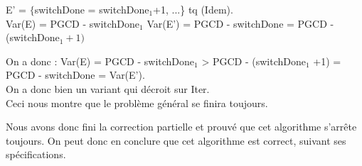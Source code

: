 E' = $\{$switchDone = switchDone$_{1}$+1, ...\} tq (Idem).\\

Var(E) = PGCD - switchDone$_{1}$
Var(E') = PGCD - switchDone = PGCD - (switchDone$_{1}+1)$

On a donc : Var(E) = PGCD - switchDone$_{1}$ > PGCD - (switchDone$_1$ +1) = PGCD - switchDone = Var(E').\\

On a donc bien un variant qui décroit sur Iter.\\

Ceci nous montre que le problème général se finira toujours. 

Nous avons donc fini la correction partielle et prouvé que cet algorithme s'arrête toujours. On peut donc en conclure que cet algorithme est correct, suivant ses spécifications. \\
